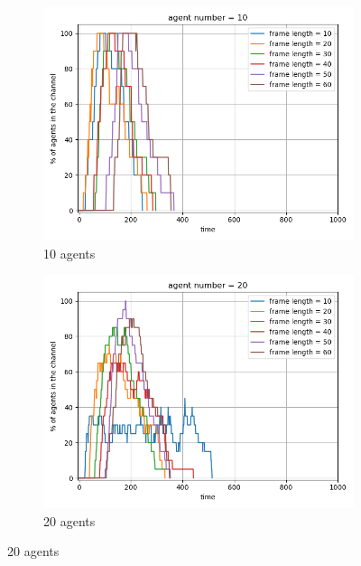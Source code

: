 {\begin{figure}[htb]
    \centering
    \begin{subfigure}[t]{0.45\linewidth}
        \centering
        \includegraphics[width=\linewidth]{figures/channel_usage_agent10.png}
        \caption{10 agents}
        \label{fig:agentpercent1}
    \end{subfigure}
    \hfill
    \begin{subfigure}[t]{0.45\linewidth}
        \centering
        \includegraphics[width=\linewidth]{figures/channel_usage_agent20.png}
        \caption{20 agents}
        \label{fig:agentpercent2}
    \end{subfigure}
    

\end{figure}}

